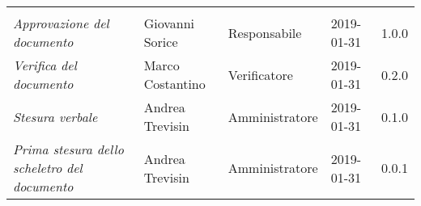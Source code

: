 \newpage 
\section*{}
\begin{table}[H]
	\centering
	\begin{tabular}{p{4cm}|C{3cm}|C{3cm}|R{2.5cm}|R{2cm}}
		
		 & & & & \\
		
		
		\emph{Approvazione del documento} & Giovanni Sorice & Responsabile & 2019-01-31 & 1.0.0 \\
		\hline
		
		\emph{Verifica del documento} & Marco Costantino & Verificatore & 2019-01-31 & 0.2.0 \\
		\hline

		\emph{Stesura verbale} & Andrea Trevisin & Amministratore & 2019-01-31 & 0.1.0 \\
		\hline
		
		\emph{Prima stesura dello scheletro del documento} & Andrea Trevisin & Amministratore & 2019-01-31 & 0.0.1 \\
		
	\end{tabular}
	
\end{table}


\clearpage